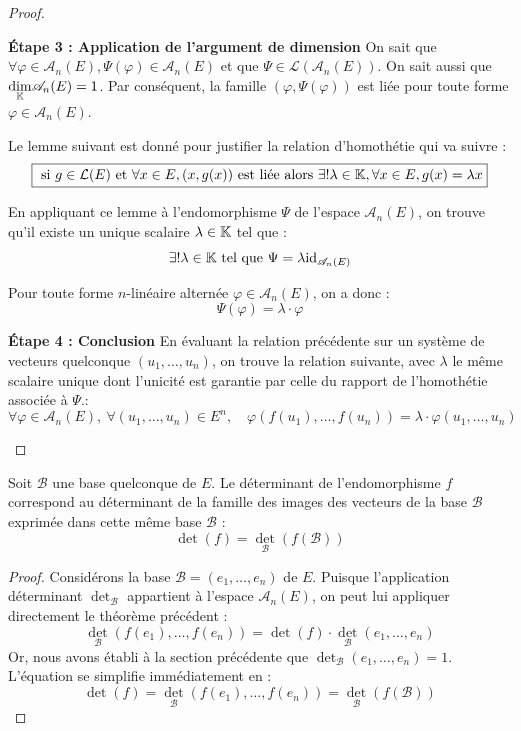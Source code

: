 \documentclass[12pt, a4paper]{report}
\begin{document}
\begin{proof}
\begin{outline}
        \1 \textbf{Étape 3 : Application de l'argument de dimension}
        \2 On sait que $\forall \varphi \in \mathscr A_n(E), \Psi(\varphi) \in \mathscr A_n(E)$ et que $\Psi \in \mathcal L(\mathcal A_n(E))$. On sait aussi que $\underset{\mathbb{K}}\dim\mathscr A_n(E) = 1$. Par conséquent, la famille $(\varphi, \Psi(\varphi))$ est liée pour toute forme $\varphi \in \mathscr A_n(E)$.

        \2 Le lemme suivant est donné pour justifier la relation d'homothétie qui va suivre :
        $$\boxed{\text{ si } g \in \mathcal L(E) \text{ et } \forall x \in E, (x,g(x)) \text{ est liée} \text{ alors } \exists ! \lambda \in \mathbb{K}, \forall x \in E, g(x) = \lambda x}$$

        \2 En appliquant ce lemme à l'endomorphisme $\Psi$ de l'espace $\mathscr{A}_n(E)$, on trouve qu'il existe un unique scalaire $\lambda \in \mathbb{K}$ tel que :
        $$\exists ! \lambda \in \mathbb{K} \text{ tel que } \Psi = \lambda\mathrm{id}_{\mathscr{A}_n(E)}$$

        \2 Pour toute forme $n$-linéaire alternée $\varphi \in \mathscr{A}_n(E)$, on a donc :
        $$\Psi(\varphi) = \lambda \cdot \varphi$$

        \1 \textbf{Étape 4 : Conclusion}
        \2 En évaluant la relation précédente sur un système de vecteurs quelconque $(u_1, \dots, u_n)$, on trouve la relation suivante, avec $\lambda$ le même scalaire unique dont l'unicité est garantie par celle du rapport de l'homothétie associée à $\Psi$.:
        $$\forall \varphi \in \mathscr{A}_n(E), \ \forall (u_1, \dots, u_n) \in E^n, \quad \varphi(f(u_1), \dots, f(u_n)) = \lambda \cdot \varphi(u_1, \dots, u_n)$$
    \end{outline}
\end{proof}

\begin{consequence}
    Soit $\mathcal{B}$ une base quelconque de $E$. Le déterminant de l'endomorphisme $f$ correspond au déterminant de la famille des images des vecteurs de la base $\mathcal{B}$ exprimée dans cette même base $\mathcal{B}$ :
    $$\det(f) = \det_{\mathcal{B}}(f(\mathcal{B}))$$
\end{consequence}

\begin{proof}
    Considérons la base $\mathcal{B} = (e_1, \dots, e_n)$ de $E$. Puisque l'application déterminant $\det_{\mathcal{B}}$ appartient à l'espace $\mathscr{A}_n(E)$, on peut lui appliquer directement le théorème précédent :
    $$\det_{\mathcal{B}}(f(e_1), \dots, f(e_n)) = \det(f) \cdot \det_{\mathcal{B}}(e_1, \dots, e_n)$$
    Or, nous avons établi à la section précédente que $\det_{\mathcal{B}}(e_1, \dots, e_n) = 1$. L'équation se simplifie immédiatement en :
    $$\det(f) = \det_{\mathcal{B}}(f(e_1), \dots, f(e_n)) = \det_{\mathcal{B}}(f(\mathcal{B}))$$
\end{proof}
\end{document}
